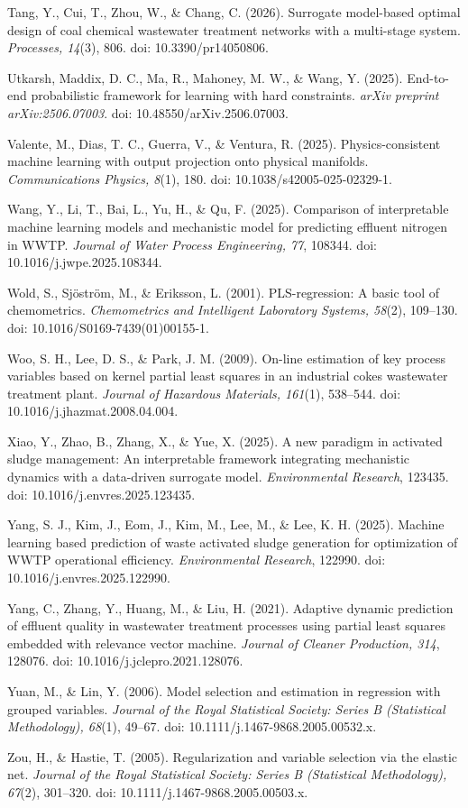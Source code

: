 \documentclass[a4paper,fleqn]{cas-sc}
\begin{document}
\noindent Tang, Y., Cui, T., Zhou, W., \& Chang, C. (2026). Surrogate model-based optimal design of coal chemical wastewater treatment networks with a multi-stage system. \textit{Processes, 14}(3), 806. doi: 10.3390/pr14050806.

\noindent Utkarsh, Maddix, D. C., Ma, R., Mahoney, M. W., \& Wang, Y. (2025). End-to-end probabilistic framework for learning with hard constraints. \textit{arXiv preprint arXiv:2506.07003}. doi: 10.48550/arXiv.2506.07003.

\noindent Valente, M., Dias, T. C., Guerra, V., \& Ventura, R. (2025). Physics-consistent machine learning with output projection onto physical manifolds. \textit{Communications Physics, 8}(1), 180. doi: 10.1038/s42005-025-02329-1.

\noindent Wang, Y., Li, T., Bai, L., Yu, H., \& Qu, F. (2025). Comparison of interpretable machine learning models and mechanistic model for predicting effluent nitrogen in WWTP. \textit{Journal of Water Process Engineering, 77}, 108344. doi: 10.1016/j.jwpe.2025.108344.

\noindent Wold, S., Sj\"ostr\"om, M., \& Eriksson, L. (2001). PLS-regression: A basic tool of chemometrics. \textit{Chemometrics and Intelligent Laboratory Systems, 58}(2), 109--130. doi: 10.1016/S0169-7439(01)00155-1.

\noindent Woo, S. H., Lee, D. S., \& Park, J. M. (2009). On-line estimation of key process variables based on kernel partial least squares in an industrial cokes wastewater treatment plant. \textit{Journal of Hazardous Materials, 161}(1), 538--544. doi: 10.1016/j.jhazmat.2008.04.004.

\noindent Xiao, Y., Zhao, B., Zhang, X., \& Yue, X. (2025). A new paradigm in activated sludge management: An interpretable framework integrating mechanistic dynamics with a data-driven surrogate model. \textit{Environmental Research}, 123435. doi: 10.1016/j.envres.2025.123435.

\noindent Yang, S. J., Kim, J., Eom, J., Kim, M., Lee, M., \& Lee, K. H. (2025). Machine learning based prediction of waste activated sludge generation for optimization of WWTP operational efficiency. \textit{Environmental Research}, 122990. doi: 10.1016/j.envres.2025.122990.

\noindent Yang, C., Zhang, Y., Huang, M., \& Liu, H. (2021). Adaptive dynamic prediction of effluent quality in wastewater treatment processes using partial least squares embedded with relevance vector machine. \textit{Journal of Cleaner Production, 314}, 128076. doi: 10.1016/j.jclepro.2021.128076.

\noindent Yuan, M., \& Lin, Y. (2006). Model selection and estimation in regression with grouped variables. \textit{Journal of the Royal Statistical Society: Series B (Statistical Methodology), 68}(1), 49--67. doi: 10.1111/j.1467-9868.2005.00532.x.

\noindent Zou, H., \& Hastie, T. (2005). Regularization and variable selection via the elastic net. \textit{Journal of the Royal Statistical Society: Series B (Statistical Methodology), 67}(2), 301--320. doi: 10.1111/j.1467-9868.2005.00503.x.
\end{document}
